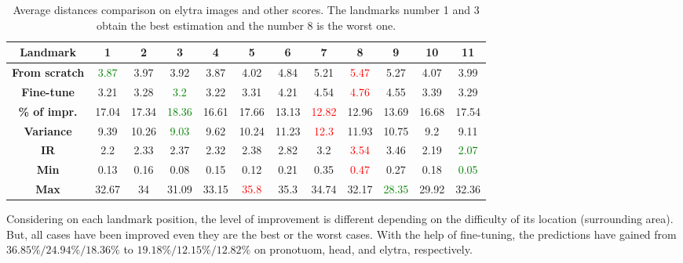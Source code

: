 \documentclass[review]{elsarticle}
\begin{document}
\begin{table}[h!]
	\centering
	\begin{tabular}{| c || c | c | c | c | c | c | c | c | c | c | c |}
		\hline
		\textbf{Landmark} & 1 & 2 & 3 & 4 & 5 & 6 & 7 & 8 & 9 & 10 & 11 \\ \hline \hline
		\textbf{From scratch} & \textcolor{green}{3.87} & 3.97 & 3.92 & 3.87 & 4.02 & 4.84 & 5.21 & \textcolor{red}{5.47} & 5.27 & 4.07 & 3.99 \\ \hline
		\textbf{Fine-tune} & 3.21 & 3.28 & \textcolor{green}{3.2} & 3.22 & 3.31 & 4.21 & 4.54 & \textcolor{red}{4.76} & 4.55 & 3.39 & 3.29 \\ \hline 
		\textbf{\% of impr.} & 17.04 & 17.34 & \textcolor{green}{18.36} & 16.61 & 17.66 & 13.13 & \textcolor{red}{12.82} & 12.96 & 13.69 & 16.68 & 17.54 \\ \hline \hline
		\textbf{Variance} & 9.39 & 10.26 & \textcolor{green}{9.03} & 9.62 & 10.24 & 11.23 & \textcolor{red}{12.3} & 11.93 & 10.75 & 9.2 & 9.11 \\ \hline
		\textbf{IR} & 2.2 & 2.33 & 2.37 & 2.32 & 2.38 & 2.82 & 3.2 & \textcolor{red}{3.54} & 3.46 & 2.19 & \textcolor{green}{2.07} \\ \hline
		\textbf{Min} & 0.13 & 0.16 & 0.08 & 0.15 & 0.12 & 0.21 & 0.35 & \textcolor{red}{0.47} & 0.27 & 0.18 & \textcolor{green}{0.05} \\ \hline
		\textbf{Max} & 32.67 & 34 & 31.09 & 33.15 & \textcolor{red}{35.8} & 35.3 & 34.74 & 32.17 & \textcolor{green}{28.35} & 29.92 & 32.36 \\ \hline

	\end{tabular}
	\caption{Average distances comparison on elytra images and other scores. The
          landmarks number 1 and 3 obtain the best estimation and the
          number 8 is the worst one.}
	\label{tblfn_elytra}
\end{table}

Considering on each landmark position, the level of improvement is different depending on the difficulty of its location (surrounding area). But, all cases have been improved even they are the best or the worst cases. With the help of fine-tuning, the predictions have gained from $36.85\%/ 24.94\%/ 18.36\%$ to $19.18\%/ 12.15\%/ 12.82\%$ on pronotuom, head, and elytra, respectively.
\end{document}
